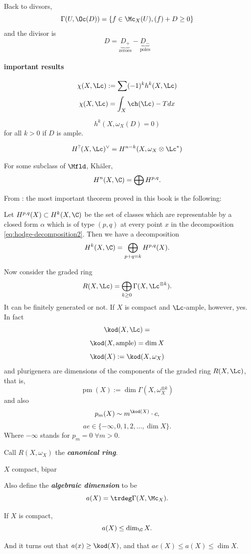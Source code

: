 Back to divsors,
\[\Gamma(U,\Oc(D))=\{f\in\Mc_X(U),(f)+D\geq0\}\]
and the divisor is
\[D=\underbrace{D_+}_{\text{zeroes}}-\underbrace{D_-}_{\text{poles}}\]
\paragraph{important results}
\begin{thm}
	\[\chi(X,\Lc):=\sum(-1)^kh^k(X,\Lc)\]
	\[\chi(X,\Lc)=\int_X\ch(\Lc)-Tdx\]
\end{thm}
\begin{thm}
	\[h^k(X,\omega_X(D)=0)\]
	for all $k>0$ if $D$ is ample.
\end{thm}
\begin{thm}
	\[H^?(X,\Lc)^\vee=H^{n-k}(X,\omega_X\otimes\Lc^*)\]
\end{thm}
\begin{thm}[Hodge]
	For some subclass of $\Mfld$, Khäler,
	\[H^n(X,\C)=\bigoplus H^{p,q}.\]
\end{thm}
From \cite{voisin-intro}: the most important theorem proved in this book is the following:
\begin{thm}
	Let $H^{p,q}(X) \subset H^k(X,\C)$ be the set of classes which are representable by a closed form $\alpha$ which is of type $(p,q)$ at every point $x$ in the decomposition \cref{eq:hodge-decomposition2}. Then we have a decomposition
	\[H^k(X,\C)=\bigoplus_{p+q=k}H^{p,q}(X).\]
\end{thm}
Now consider the graded ring
\[R(X,\Lc)=\bigoplus_{k\geq0}\Gamma(X,\Lc^{\otimes k}).\]
It can be finitely generated or not. If $X$ is compact and $\Lc$-ample, however, yes. In fact
\[\kod(X,\Lc)=\]
\[\kod(X,\text{ample})=\dim X\]
\[\kod(X):=\kod(X,\omega_X)\]
and plurigenera are dimensions of the components of the graded ring $R(X,\Lc)$, that is,
\[\operatorname{pm}(X):=\dim\Gamma(X,\omega_X^{\otimes k})\]
and also
\[p_m(X)\sim m^{\kod(X)}\cdot c,\]
\[ae\in\{-\infty,0,1,2,\ldots,\dim X\}.\]
Where $-\infty$ stands for $p_m=0\;\forall m>0$.

Call $R(X,\omega_X)$ the \textbf{\textit{canonical ring}}.
\begin{thm}[Caseini, et al. 2006]
	$X$ compact, bipar
\end{thm}
Also define the \textbf{\textit{algebraic dimension}} to be
\[a(X)=\trdeg\Gamma(X,\Mc_X).\]
\begin{thm}[Siegel]
	If $X$ is compact,
	\[a(X)\leq\dim_\C X.\]
\end{thm}
And it turns out that $a(x)\geq\kod(X)$, and that $ae(X)\leq a(X)\leq \dim X$.
